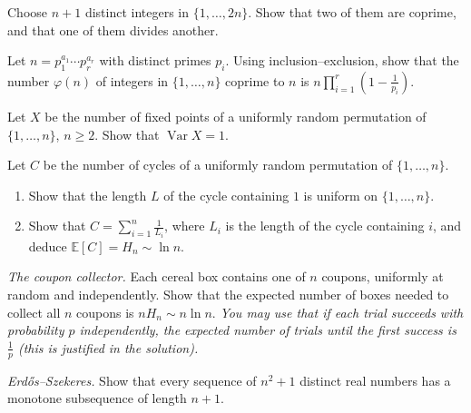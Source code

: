 \begin{exercise}[$\star\star$]\label{ex:pigeon}
Choose $n+1$ distinct integers in $\{1,\dots,2n\}$. Show that two of them are coprime, and that one of them divides another.
\end{exercise}

\begin{exercise}[$\star\star$]\label{ex:phi}
Let $n=p_1^{a_1}\cdots p_r^{a_r}$ with distinct primes $p_i$. Using inclusion--exclusion, show that the number $\varphi(n)$ of integers in $\{1,\dots,n\}$ coprime to $n$ is
$n\prod_{i=1}^r\left(1-\frac1{p_i}\right)$.
\end{exercise}

\begin{exercise}[$\star\star$]\label{ex:fixedvar}
Let $X$ be the number of fixed points of a uniformly random permutation of $\{1,\dots,n\}$, $n\ge2$. Show that $\operatorname{Var}X=1$.
\end{exercise}

\begin{exercise}[$\star\star$]\label{ex:cycles}
Let $C$ be the number of cycles of a uniformly random permutation of $\{1,\dots,n\}$.
\begin{enumerate}[label=(\alph*)]
\item Show that the length $L$ of the cycle containing $1$ is uniform on $\{1,\dots,n\}$.
\item Show that $C=\sum_{i=1}^n\frac1{L_i}$, where $L_i$ is the length of the cycle containing $i$, and deduce $\mathbb E[C]=H_n\sim\ln n$.
\end{enumerate}
\end{exercise}

\begin{exercise}[$\star\star\star$]\label{ex:coupon}
\emph{The coupon collector.} Each cereal box contains one of $n$ coupons, uniformly at random and independently. Show that the expected number of boxes needed to collect all $n$
coupons is $nH_n\sim n\ln n$. \emph{You may use that if each trial succeeds with probability $p$ independently, the expected number of trials until the first success is $\frac1p$ (this is justified in the solution).}
\end{exercise}

\begin{exercise}[$\star\star\star$]\label{ex:erdos}
\emph{Erd\H{o}s--Szekeres.} Show that every sequence of $n^2+1$ distinct real numbers has a monotone subsequence of length $n+1$.
\end{exercise}

